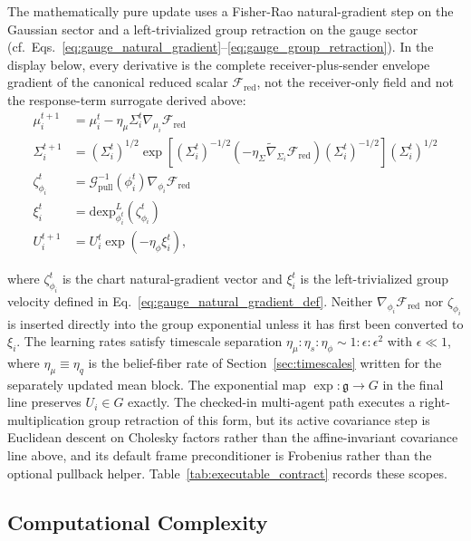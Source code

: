 \documentclass[11pt]{article}
\begin{document}
The mathematically pure update uses a Fisher-Rao natural-gradient step on the Gaussian sector and a left-trivialized group retraction on the gauge sector (cf.\ Eqs.~\ref{eq:gauge_natural_gradient}--\ref{eq:gauge_group_retraction}). In the display below, every derivative is the complete receiver-plus-sender envelope gradient of the canonical reduced scalar $\mathcal{F}_{\mathrm{red}}$, not the receiver-only field and not the response-term surrogate derived above:
\begin{align}
\mu_i^{t+1} &= \mu_i^t - \eta_\mu \Sigma_i^t \nabla_{\mu_i} \mathcal{F}_{\mathrm{red}} \\
\Sigma_i^{t+1} &= \left(\Sigma_i^t\right)^{1/2} \exp\left[\left(\Sigma_i^t\right)^{-1/2}\left(-\eta_\Sigma \tilde{\nabla}_{\Sigma_i} \mathcal{F}_{\mathrm{red}}\right)\left(\Sigma_i^t\right)^{-1/2}\right] \left(\Sigma_i^t\right)^{1/2} \\
\zeta_{\phi_i}^t &= \mathcal{G}_{\mathrm{pull}}^{-1}(\phi_i^t)\nabla_{\phi_i} \mathcal{F}_{\mathrm{red}} \\
\xi_i^t &= \mathrm{dexp}_{\phi_i^t}^{L}(\zeta_{\phi_i}^t) \\
U_i^{t+1} &= U_i^t \exp\left(-\eta_\phi \xi_i^t\right),
\end{align}

where $\zeta_{\phi_i}^t$ is the chart natural-gradient vector and $\xi_i^t$ is the left-trivialized group velocity defined in Eq.~\ref{eq:gauge_natural_gradient_def}. Neither $\nabla_{\phi_i}\mathcal{F}_{\mathrm{red}}$ nor $\zeta_{\phi_i}$ is inserted directly into the group exponential unless it has first been converted to $\xi_i$. The learning rates satisfy timescale separation $\eta_\mu : \eta_s : \eta_\phi \sim 1 : \epsilon : \epsilon^2$ with $\epsilon \ll 1$, where $\eta_\mu \equiv \eta_q$ is the belief-fiber rate of Section~\ref{sec:timescales} written for the separately updated mean block. The exponential map $\exp : \mathfrak{g} \to G$ in the final line preserves $U_i \in G$ exactly. The checked-in multi-agent path executes a right-multiplication group retraction of this form, but its active covariance step is Euclidean descent on Cholesky factors rather than the affine-invariant covariance line above, and its default frame preconditioner is Frobenius rather than the optional pullback helper. Table~\ref{tab:executable_contract} records these scopes.

\subsection*{Computational Complexity}
\end{document}
